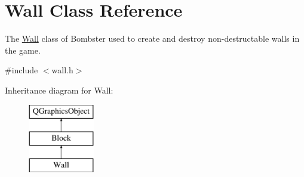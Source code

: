 \hypertarget{class_wall}{\section{Wall Class Reference}
\label{class_wall}
}


The \hyperlink{class_wall}{Wall} class of Bombster used to create and destroy non-\/destructable walls in the game.  




{\ttfamily \#include $<$wall.\-h$>$}

Inheritance diagram for Wall\-:\begin{figure}[H]
\begin{center}
\leavevmode
\includegraphics[height=3.000000cm]{class_wall}
\end{center}
\end{figure}
